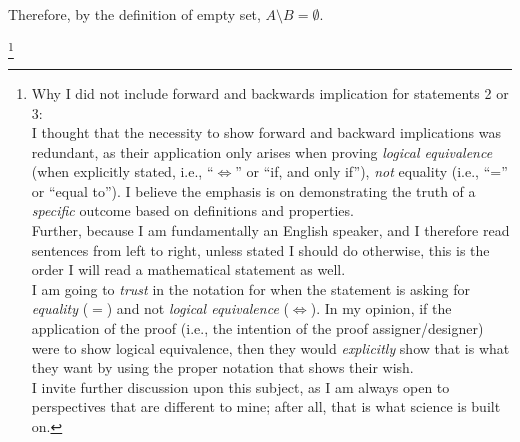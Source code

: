 {\begin{enumerate}
\begin{itemize}
                Therefore, by the definition of empty set, $A\setminus B = \emptyset$. 
            \end{itemize}
        \end{enumerate}
    }

    

    \footnote{Why I did not include forward and backwards implication for statements 2 or 3: \\

    I thought that the necessity to show forward and backward implications was redundant, as their application only arises when proving \textit{logical equivalence} (when explicitly stated, i.e., ``$\iff$'' or ``if, and only if''), \textit{not} equality (i.e., ``='' or ``equal to''). I believe the emphasis is on demonstrating the truth of a \textit{specific} outcome based on definitions and properties. \\

    Further, because I am fundamentally an English speaker, and I therefore read sentences from left to right, unless stated I should do otherwise, this is the order I will read a mathematical statement as well. \\

    I am going to \textit{trust} in the notation for when the statement is asking for \textit{equality} ($=$) and not \textit{logical equivalence} ($\iff$). In my opinion, if the application of the proof (i.e., the intention of the proof assigner/designer) were to show logical equivalence, then they would \textit{explicitly} show that is what they want by using the proper notation that shows their wish. \\

    I invite further discussion upon this subject, as I am always open to perspectives that are different to mine; after all, that is what science is built on.}

    




